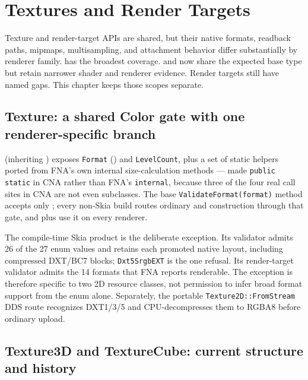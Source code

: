 \chapter{Textures and Render Targets}
\label{ch:textures-rendertargets}

Texture and render-target APIs are shared, but their native formats, readback paths, mipmaps,
multisampling, and attachment behavior differ substantially by renderer family.
 has the broadest coverage.  and
 now share the expected base type but retain narrower shader and renderer
evidence. Render targets still have named gaps. This chapter keeps those scopes separate.



\section{Texture: a shared Color gate with one renderer-specific branch}

 (inheriting ) exposes \texttt{Format}
() and \texttt{LevelCount}, plus a set of static helpers ported from
FNA's own internal size-calculation methods --- made \texttt{public static} in CNA rather
than FNA's \texttt{internal}, because three of the four real call sites in CNA are not even
 subclasses. The base \texttt{ValidateFormat(format)} method accepts only
; every non-Skia build routes ordinary  and
 construction through that gate, and  plus
 use it on every renderer.

The compile-time Skia product is the deliberate exception. Its  validator
admits 26 of the 27 enum values and retains each promoted native layout, including compressed
DXT/BC7 blocks; \texttt{Dxt5SrgbEXT} is the one refusal. Its render-target validator admits the
14 formats that FNA reports renderable. The
exception is therefore specific to two 2D resource classes, not permission to infer broad format
support from the enum alone. Separately, the portable \texttt{Texture2D::FromStream} DDS route
recognizes DXT1/3/5 and CPU-decompresses them to RGBA8 before ordinary upload.

\section{Texture3D and TextureCube: current structure and history}
\label{sec:texture3d-inheritance}

